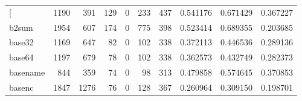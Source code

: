 \begin{longtable}{lrrrrrrrrr}
\bottomrule
\endlastfoot
{[}         &                                1190 &                                             391 &                                            129 &                                             0 &                                            233 &                                          437 &                                           0.541176 &                               0.671429 &                             0.367227 \\
b2sum     &                                1954 &                                             607 &                                            174 &                                             0 &                                            775 &                                          398 &                                           0.523414 &                               0.689355 &                             0.203685 \\
base32    &                                1169 &                                             647 &                                             82 &                                             0 &                                            102 &                                          338 &                                           0.372113 &                               0.446536 &                             0.289136 \\
base64    &                                1197 &                                             679 &                                             78 &                                             0 &                                            102 &                                          338 &                                           0.362573 &                               0.432749 &                             0.282373 \\
basename  &                                 844 &                                             359 &                                             74 &                                             0 &                                             98 &                                          313 &                                           0.479858 &                               0.574645 &                             0.370853 \\
basenc    &                                1847 &                                            1276 &                                             76 &                                             0 &                                            128 &                                          367 &                                           0.260964 &                               0.309150 &                             0.198701 \\

\end{longtable}
